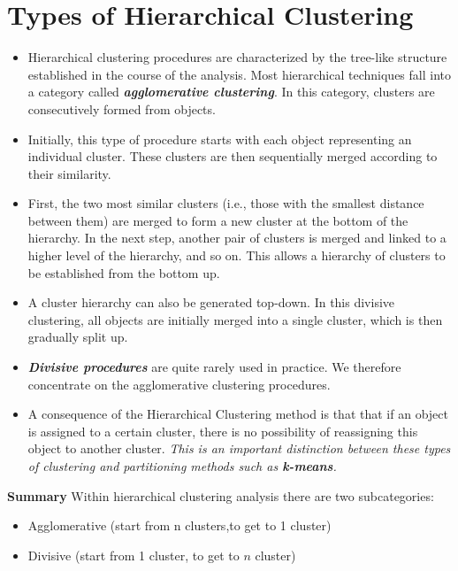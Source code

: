 \documentclass[SKLCluster.tex]{subfiles}
\begin{document}
\section{Types of Hierarchical Clustering}
\begin{itemize}
\item
Hierarchical clustering procedures are characterized by the tree-like structure
established in the course of the analysis. Most hierarchical techniques fall into a
category called \textbf{\textit{agglomerative clustering}}. In this category, clusters are consecutively
formed from objects. 
\item Initially, this type of procedure starts with each object
representing an individual cluster. These clusters are then sequentially merged
according to their similarity. 
\item First, the two most similar clusters (i.e., those with
the smallest distance between them) are merged to form a new cluster at the bottom
of the hierarchy. In the next step, another pair of clusters is merged and linked to a
higher level of the hierarchy, and so on. This allows a hierarchy of clusters to be
established from the bottom up.
\item A cluster hierarchy can also be generated top-down. In this divisive clustering,
all objects are initially merged into a single cluster, which is then gradually split up. 
\item \textbf{\textit{Divisive procedures}} are quite rarely used in practice. We therefore
concentrate on the agglomerative clustering procedures.
\item A consequence of the Hierarchical Clustering method is that that if an object is assigned
to a certain cluster, there is no possibility of reassigning this object to another
cluster.\textit{ This is an important distinction between these types of clustering and
partitioning methods such as \textbf{\textit{k-means}}.}
\end{itemize}
\noindent \textbf{Summary} Within hierarchical clustering analysis there are two subcategories: 
\begin{itemize}
\item Agglomerative (start from n clusters,to get to 1 cluster)
\item Divisive (start from 1 cluster, to get to $n$ cluster)
\end{itemize}
\newpage
\end{document}

